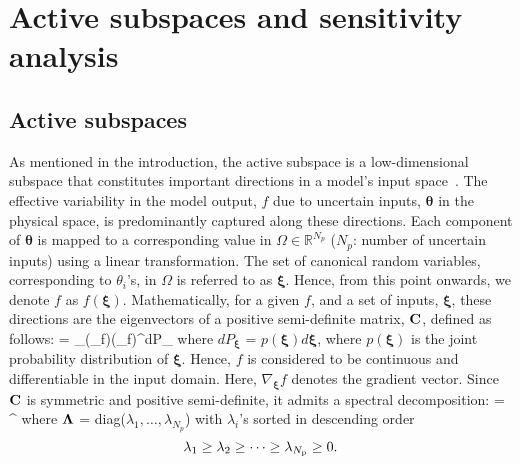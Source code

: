 \section{Active subspaces and sensitivity analysis}
\label{sec:assa}

\subsection{Active subspaces}
\label{sub:ac}
As mentioned in the introduction, the active subspace is a low-dimensional subspace
that constitutes important directions in a model's input
space~\cite{Constantine:2015}. The effective variability in the model output, $f$
due to uncertain inputs, $\bm{\theta}$ in the physical space, is predominantly captured
along these directions. Each component of $\bm{\theta}$
is mapped to a corresponding value in $\Omega\in\mathbb{R}^{N_p}$
($N_p$: number of uncertain inputs)
using a linear transformation.  The set of canonical random variables, corresponding
to $\theta_i$'s, in $\Omega$ is referred to as $\bm{\xi}$.
Hence, from this point onwards, we denote $f$ as $f(\bm{\xi})$.
Mathematically, for a given $f$, and a set of inputs, $\bm{\xi}$,
these directions are the eigenvectors of a positive
semi-definite matrix, $\mathbf{{C}}$, defined as follows: 
%
\be
{} = \int_\Omega (\nabla_{\bm{\xi}}f)(\nabla_{\bm{\xi}}f)^\top dP_{\bm{\xi}}
\label{eq:C}
\ee
%
where 
$dP_{\bm{\xi}}$ = $p(\bm{\xi})d\bm{\xi}$, where $p(\bm{\xi})$ is the joint probability
distribution of $\bm{\xi}$. Hence, $f$ is considered to be continuous 
and differentiable in the input domain. 
Here,
$\nabla_{\bm{\xi}}f$ denotes the gradient vector. 
Since $\mathbf{{C}}$ is symmetric and
positive semi-definite, it admits a spectral decomposition:
%
\be
{} = \mat{\Lambda}^\top
\ee
%
where $\mathbf{{\Lambda}}$ = diag($\lambda_1,\ldots,\lambda_{N_p}$) with
$\lambda_i$'s sorted in descending order
\[
     \lambda_1 \geq \lambda_2 \geq \cdots \geq \lambda_{N_\text{p}} \geq 0.
\] 

